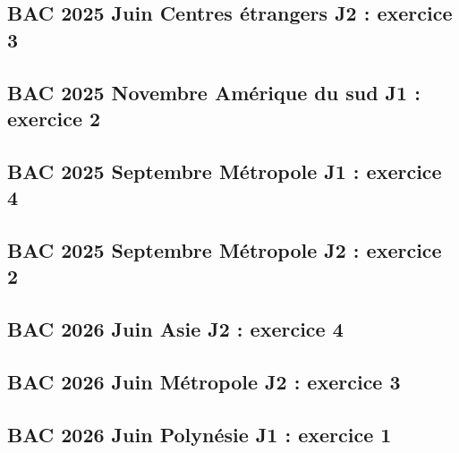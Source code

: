 \documentclass[lang=fr,edition=teacher,layout=sheet]{mxbook}
\begin{document}
\par\bigskip
{}\subsection*{BAC 2025 Juin Centres étrangers J2 : exercice 3}
\begingroup\endgroup
\par\bigskip
{}\subsection*{BAC 2025 Novembre Amérique du sud J1 : exercice 2}
\begingroup\endgroup
\par\bigskip
{}\subsection*{BAC 2025 Septembre Métropole J1 : exercice 4}
\begingroup\endgroup
\par\bigskip
{}\subsection*{BAC 2025 Septembre Métropole J2 : exercice 2}
\begingroup\endgroup
\par\bigskip
{}\subsection*{BAC 2026 Juin Asie J2 : exercice 4}
\begingroup\endgroup
\par\bigskip
{}\subsection*{BAC 2026 Juin Métropole J2 : exercice 3}
\begingroup\endgroup
\par\bigskip
{}\subsection*{BAC 2026 Juin Polynésie J1 : exercice 1}
\end{document}
